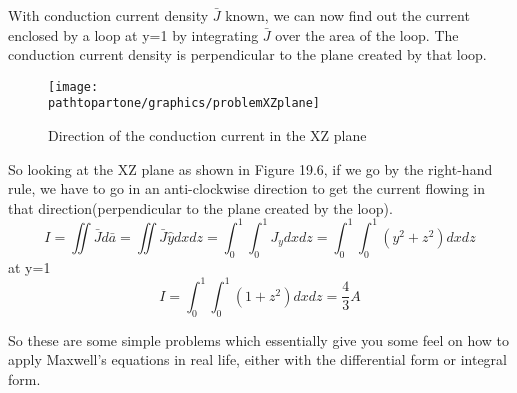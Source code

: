 \begin{exmp}
With conduction current density $\bar{J}$ known, we can now find out the current enclosed by a loop at y=1 by integrating $\bar{J}$ over the area of the loop. The conduction current density is perpendicular to the plane created by that loop.
\begin{figure}[h]
\centering
\texttt{[image: \\pathtopartone/graphics/problemXZplane]}
\caption{Direction of the conduction current in the XZ plane}
\end{figure} 
So looking at the XZ plane as shown in Figure 19.6, if we go by the right-hand rule, we have to go in an anti-clockwise direction to get the current flowing in that direction(perpendicular to the plane created by the loop).
\begin{dmath*}
I=\iint\bar{J}d\bar{a}=\iint\bar{J}\hat{y}dxdz
=\int_{0}^{1}\int_{0}^{1}J_{y}dxdz
=\int_{0}^{1}\int_{0}^{1}(y^{2}+z^{2})dxdz
\end{dmath*}
at y=1
\begin{dmath*}
I=\int_{0}^{1}\int_{0}^{1}(1+z^{2})dxdz
= \frac{4}{3}A
\end{dmath*}
\end{exmp}
So these are some simple problems which essentially give you some feel on how to apply Maxwell's equations in real life, either with the differential form or integral form.

